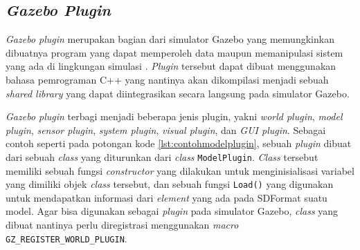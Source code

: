 \subsection{\emph{Gazebo Plugin}}
\label{subsec:gazeboplugin}

\emph{Gazebo plugin} merupakan bagian dari simulator Gazebo yang memungkinkan dibuatnya program yang dapat memperoleh data maupun memanipulasi sistem yang ada di lingkungan simulasi \citep{url:gazeboplugin}.
\emph{Plugin} tersebut dapat dibuat menggunakan bahasa pemrograman C++ yang nantinya akan dikompilasi menjadi sebuah \emph{shared library} yang dapat diintegrasikan secara langsung pada simulator Gazebo.



\emph{Gazebo plugin} terbagi menjadi beberapa jenis plugin,
  yakni \emph{world plugin}, \emph{model plugin}, \emph{sensor plugin}, \emph{system plugin}, \emph{visual plugin}, dan \emph{GUI plugin}.
Sebagai contoh seperti pada potongan kode \ref{lst:contohmodelplugin},
  sebuah \emph{plugin} dibuat dari sebuah \emph{class} yang diturunkan dari \emph{class} \lstinline{ModelPlugin}.
\emph{Class} tersebut memiliki sebuah fungsi \emph{constructor} yang dilakukan untuk menginisialisasi variabel yang dimiliki objek \emph{class} tersebut,
  dan sebuah fungsi \lstinline{Load()} yang digunakan untuk mendapatkan informasi dari \emph{element} yang ada pada SDFormat suatu model.
Agar bisa digunakan sebagai \emph{plugin} pada simulator Gazebo,
  \emph{class} yang dibuat nantinya perlu diregistrasi menggunakan \emph{macro} \lstinline{GZ_REGISTER_WORLD_PLUGIN}.
